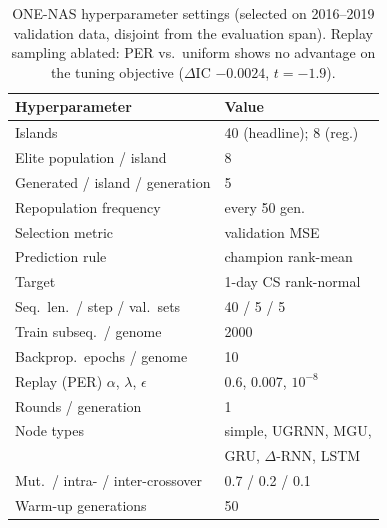 \begin{table}[t]
\centering
\footnotesize
\begin{tabular}{@{}l@{\hspace{4pt}}l@{}}
\toprule
Hyperparameter & Value \\
\midrule
Islands & 40 (headline); 8 (reg.) \\
Elite population / island & 8 \\
Generated / island / generation & 5 \\
Repopulation frequency & every 50 gen. \\
Selection metric & validation MSE \\
Prediction rule & champion rank-mean \\
Target & 1-day CS rank-normal \\
Seq.\ len.\ / step / val.\ sets & 40 / 5 / 5 \\
Train subseq.\ / genome & 2000 \\
Backprop.\ epochs / genome & 10 \\
Replay (PER) $\alpha$, $\lambda$, $\epsilon$ & 0.6, 0.007, $10^{-8}$ \\
Rounds / generation & 1 \\
Node types & simple, UGRNN, MGU, \\
 & GRU, $\Delta$-RNN, LSTM \\
Mut.\ / intra- / inter-crossover & 0.7 / 0.2 / 0.1 \\
Warm-up generations & 50 \\
\bottomrule
\end{tabular}
\caption{ONE-NAS hyperparameter settings (selected on 2016--2019
validation data, disjoint from the evaluation span). Replay sampling
ablated: PER vs.\ uniform shows no advantage on the tuning objective
($\Delta$IC $-0.0024$, $t{=}-1.9$).}
\label{tab:hps}
\end{table}
